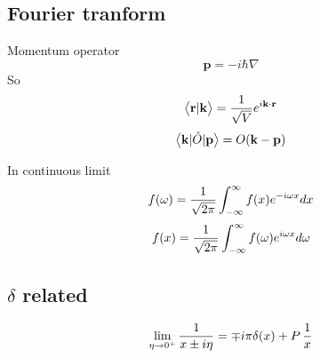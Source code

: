 \subsection{Fourier tranform}
Momentum operator
\begin{equation}
\mathbf{p}=-i\hbar\nabla
\end{equation}
So 
\begin{equation}
\bigl<{{\mathbf{r}}|{\mathbf{k}}}\bigr>=\frac{1}{\sqrt{V}}e^{i\mathbf{k}\cdot\mathbf{r}}
\end{equation}
\begin{equation}
\bigl<{\mathbf{k}{\lvert{\hat{O}}\rvert}\mathbf{p}}\bigr>=O(\mathbf{k}-\mathbf{p})
\end{equation}

In continuous limit
\begin{equation}
f(\omega)=\frac{1}{\sqrt{2\pi}}\int_{-\infty}^{\infty}{f(x)}e^{-i\omega{x}}dx
\end{equation}
\begin{equation}
f(x)=\frac{1}{\sqrt{2\pi}}\int_{-\infty}^{\infty}{f(\omega)}e^{i\omega{x}}d\omega
\end{equation}

\subsection{$\delta$ related}
\begin{equation}
\lim_{\eta\rightarrow0^{+}}\frac{1}{x\pm{}i\eta}=\mp{}i\pi\delta{(x)}+P\,\frac{1}{x}
\end{equation}

